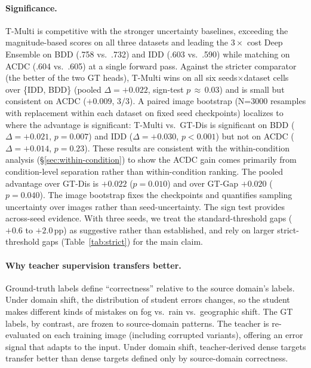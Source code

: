 \documentclass{article}
\begin{document}
\paragraph{Significance.} T-Multi is competitive with the stronger uncertainty baselines, exceeding the magnitude-based scores on all three datasets and leading the $3\times$ cost Deep Ensemble on BDD (.758 vs.\ .732) and IDD (.603 vs.\ .590) while matching on ACDC (.604 vs.\ .605) at a single forward pass. Against the stricter comparator (the better of the two GT heads), T-Multi wins on all six seeds$\times$dataset cells over \{IDD, BDD\} (pooled $\Delta{=}{+}0.022$, sign-test $p\,{\approx}\,0.03$) and is small but consistent on ACDC ($+0.009$, $3/3$). A paired image bootstrap (N=$3000$ resamples with replacement within each dataset on fixed seed checkpoints) localizes to where the advantage is significant: T-Multi vs.\ GT-Dis is significant on BDD ($\Delta{=}{+}0.021$, $p{=}0.007$) and IDD ($\Delta{=}{+}0.030$, $p{<}0.001$) but not on ACDC ($\Delta{=}{+}0.014$, $p{=}0.23$). These results are consistent with the within-condition analysis (\S\ref{sec:within-condition}) to show the ACDC gain comes primarily from condition-level separation rather than within-condition ranking. The pooled advantage over GT-Dis is $+0.022$ ($p{=}0.010$) and over GT-Gap $+0.020$ ($p{=}0.040$). The image bootstrap fixes the checkpoints and quantifies sampling uncertainty over images rather than seed-uncertainty. The sign test provides across-seed evidence. With three seeds, we treat the standard-threshold gaps ($+0.6$ to $+2.0$\,pp) as suggestive rather than established, and rely on larger strict-threshold gaps (Table~\ref{tab:strict}) for the main claim.


\paragraph{Why teacher supervision transfers better.} Ground-truth labels define ``correctness'' relative to the source domain's labels. Under domain shift, the distribution of student errors changes, so the student makes different kinds of mistakes on fog vs.\ rain vs.\ geographic shift. The GT labels, by contrast, are frozen to source-domain patterns. The teacher is re-evaluated on each training image (including corrupted variants), offering an error signal that adapts to the input. Under domain shift, teacher-derived dense targets transfer better than dense targets defined only by source-domain correctness.
\end{document}

